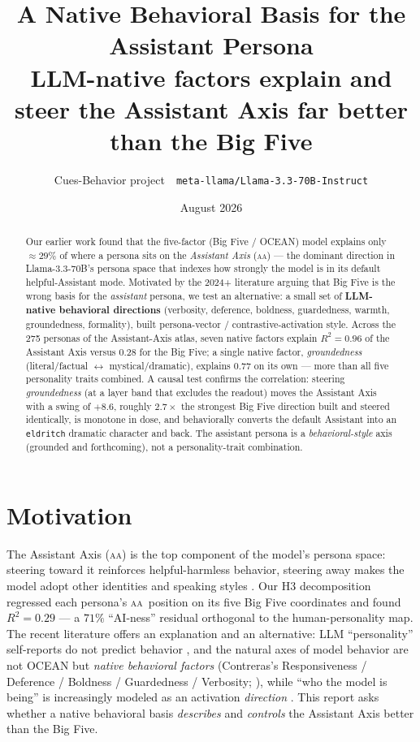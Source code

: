 \documentclass[11pt]{article}
\title{\textbf{A Native Behavioral Basis for the Assistant Persona}\\[2pt]
\large LLM-native factors explain and steer the Assistant Axis far better than the Big Five}
\author{Cues-Behavior project \,\textbullet\, \texttt{meta-llama/Llama-3.3-70B-Instruct}}
\date{August 2026}
\renewcommand{\aa}{\textsc{aa}}
\newcommand{\R}{R^2}
\begin{document}
\maketitle

\begin{abstract}
\noindent Our earlier work found that the five-factor (Big Five / OCEAN) model
explains only $\approx 29\%$ of where a persona sits on the \emph{Assistant Axis}
(\aa) --- the dominant direction in Llama-3.3-70B's persona space that indexes how
strongly the model is in its default helpful-Assistant mode. Motivated by the 2024+
literature arguing that Big Five is the wrong basis for the \emph{assistant} persona,
we test an alternative: a small set of \textbf{LLM-native behavioral directions}
(verbosity, deference, boldness, guardedness, warmth, groundedness, formality),
built persona-vector / contrastive-activation style. Across the 275 personas of the
Assistant-Axis atlas, seven native factors explain \textbf{$\R=0.96$} of the
Assistant Axis versus $0.28$ for the Big Five; a single native factor,
\emph{groundedness} (literal/factual $\leftrightarrow$ mystical/dramatic), explains
$0.77$ on its own --- more than all five personality traits combined. A causal test
confirms the correlation: steering \emph{groundedness} (at a layer band that
excludes the readout) moves the Assistant Axis with a swing of $+8.6$, roughly
$2.7\times$ the strongest Big Five direction built and steered identically, is
monotone in dose, and behaviorally converts the default Assistant into an
\texttt{eldritch} dramatic character and back. The assistant persona is a
\emph{behavioral-style} axis (grounded and forthcoming), not a personality-trait
combination.
\end{abstract}

\section{Motivation}
The Assistant Axis (\aa) is the top component of the model's persona space: steering
toward it reinforces helpful-harmless behavior, steering away makes the model adopt
other identities and speaking styles \citep{assistantaxis}. Our H3 decomposition
regressed each persona's \aa\ position on its five Big Five coordinates and found
$\R=0.29$ --- a $71\%$ ``AI-ness'' residual orthogonal to the human-personality map.
The recent literature offers an explanation and an alternative: LLM ``personality''
self-reports do not predict behavior \citep{contreras,illusion}, and the natural
axes of model behavior are not OCEAN but \emph{native behavioral factors}
(Contreras's Responsiveness / Deference / Boldness / Guardedness / Verbosity;
\citealp{contreras}), while ``who the model is being'' is increasingly modeled as an
activation \emph{direction} \citep{personavectors,emergentmisalign}. This report asks
whether a native behavioral basis \emph{describes} and \emph{controls} the Assistant
Axis better than the Big Five.
\end{document}
